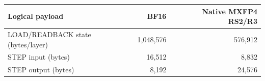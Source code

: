 \begin{tabular}{lrr}
\toprule
Logical payload & BF16 & Native MXFP4 RS2/R3 \\
\midrule
LOAD/READBACK state (bytes/layer) & 1{,}048{,}576 & 576{,}912 \\
STEP input (bytes) & 16{,}512 & 8{,}832 \\
STEP output (bytes) & 8{,}192 & 24{,}576 \\
\bottomrule
\end{tabular}
